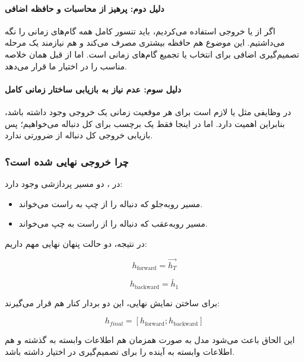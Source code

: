 \documentclass{article}
\begin{document}
\paragraph{دلیل دوم: پرهیز از محاسبات و حافظه اضافی}
اگر از  یا خروجی  استفاده می‌کردیم، باید تنسور کامل همه گام‌های زمانی را نگه می‌داشتیم. این موضوع هم حافظه بیشتری مصرف می‌کند و هم نیازمند یک مرحله تصمیم‌گیری اضافی برای انتخاب یا تجمیع گام‌های زمانی است. اما  از قبل همان خلاصه مناسب را در اختیار ما قرار می‌دهد.

\paragraph{دلیل سوم: عدم نیاز به بازیابی ساختار زمانی کامل}
در وظایفی مثل  یا  لازم است برای هر موقعیت زمانی یک خروجی وجود داشته باشد، بنابراین  اهمیت دارد. اما در اینجا فقط یک برچسب برای کل دنباله می‌خواهیم؛ پس بازیابی خروجی کل دنباله از  ضرورتی ندارد.

\subsubsection{چرا خروجی نهایی  شده است؟}

در ، دو مسیر پردازشی وجود دارد:
\begin{itemize}
	\item مسیر رو‌به‌جلو که دنباله را از چپ به راست می‌خواند.
	\item مسیر رو‌به‌عقب که دنباله را از راست به چپ می‌خواند.
\end{itemize}

در نتیجه، دو حالت پنهان نهایی مهم داریم:

\begin{equation}
	h_{\text{forward}} = \overrightarrow{h_T}
\end{equation}

\begin{equation}
	h_{\text{backward}} = \overleftarrow{h_1}
\end{equation}

برای ساختن نمایش نهایی، این دو بردار کنار هم قرار می‌گیرند:

\begin{equation}
	h_{final} = [h_{\text{forward}} ; h_{\text{backward}}]
\end{equation}

این الحاق باعث می‌شود مدل به صورت همزمان هم اطلاعات وابسته به گذشته و هم اطلاعات وابسته به آینده را برای تصمیم‌گیری در اختیار داشته باشد.
\end{document}
